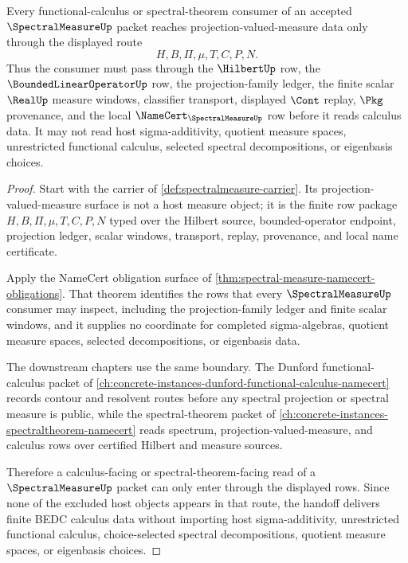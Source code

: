 \begin{theorem}
\label{thm:spectral-measure-functional-calculus-handoff}
Every functional-calculus or spectral-theorem consumer of an accepted $\SpectralMeasureUp$ packet reaches projection-valued-measure data only through the displayed route
$$
H,B,\Pi,\mu,T,C,P,N .
$$
Thus the consumer must pass through the $\HilbertUp$ row, the $\BoundedLinearOperatorUp$ row, the projection-family ledger, the finite scalar $\RealUp$ measure windows, classifier transport, displayed $\Cont$ replay, $\Pkg$ provenance, and the local $\NameCert_{\SpectralMeasureUp}$ row before it reads calculus data. It may not read host sigma-additivity, quotient measure spaces, unrestricted functional calculus, selected spectral decompositions, or eigenbasis choices.
\end{theorem}
\begin{proof}
Start with the carrier of \autoref{def:spectralmeasure-carrier}. Its projection-valued-measure surface is not a host measure object; it is the finite row package $H,B,\Pi,\mu,T,C,P,N$ typed over the Hilbert source, bounded-operator endpoint, projection ledger, scalar windows, transport, replay, provenance, and local name certificate.

Apply the NameCert obligation surface of \autoref{thm:spectral-measure-namecert-obligations}. That theorem identifies the rows that every $\SpectralMeasureUp$ consumer may inspect, including the projection-family ledger and finite scalar windows, and it supplies no coordinate for completed sigma-algebras, quotient measure spaces, selected decompositions, or eigenbasis data.

The downstream chapters use the same boundary. The Dunford functional-calculus packet of \autoref{ch:concrete-instances-dunford-functional-calculus-namecert} records contour and resolvent routes before any spectral projection or spectral measure is public, while the spectral-theorem packet of \autoref{ch:concrete-instances-spectraltheorem-namecert} reads spectrum, projection-valued-measure, and calculus rows over certified Hilbert and measure sources.

Therefore a calculus-facing or spectral-theorem-facing read of a $\SpectralMeasureUp$ packet can only enter through the displayed rows. Since none of the excluded host objects appears in that route, the handoff delivers finite BEDC calculus data without importing host sigma-additivity, unrestricted functional calculus, choice-selected spectral decompositions, quotient measure spaces, or eigenbasis choices.
\end{proof}

